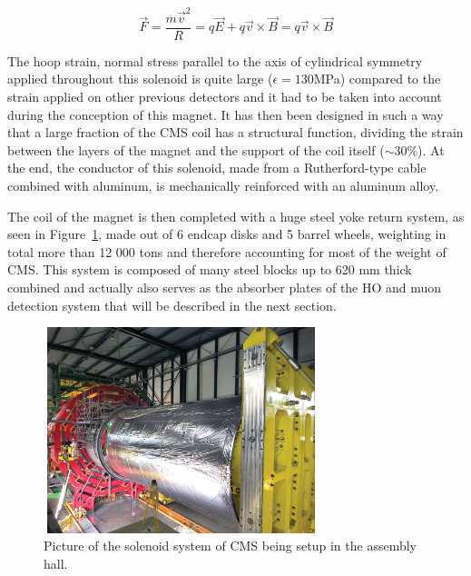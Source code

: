 \documentclass[a4paper, 10pt, openright]{report}
\begin{document}
\begin{equation}
\label{eq:Lorentz}
\overrightarrow{F} = \frac{m \overrightarrow{v}^2}{R} =  q \overrightarrow{E} + q \overrightarrow{v} \times \overrightarrow{B} = q \overrightarrow{v} \times \overrightarrow{B}
\end{equation}

The hoop strain, normal stress parallel to the axis of cylindrical symmetry applied throughout this solenoid is quite large ($\epsilon = 130$MPa) compared to the strain applied on other previous detectors and it had to be taken into account during the conception of this magnet. It has then been designed in such a way that a large fraction of the \ac{CMS} coil has a structural function, dividing the strain between the layers of the magnet and the support of the coil itself ($\sim 30$\%). At the end, the conductor of this solenoid, made from a Rutherford-type cable combined with aluminum, is mechanically reinforced with an aluminum alloy.

The coil of the magnet is then completed with a huge steel yoke return system, as seen in Figure~\ref{fig:CMSMagnet}, made out of 6 endcap disks and 5 barrel wheels, weighting in total more than 12 000 tons and therefore accounting for most of the weight of \ac{CMS}. This system is composed of many steel blocks up to 620 mm thick combined and actually also serves as the absorber plates of the \ac{HO} and muon detection system that will be described in the next section. %

\begin{figure}[htbp]
\begin{center}
\includegraphics[width=8cm, height=6cm]{figs/CMSMagnet.jpg}
\caption{Picture of the solenoid system of \ac{CMS} being setup in the assembly hall.}
\label{fig:CMSMagnet}
\end{center}
\end{figure}
\end{document}
